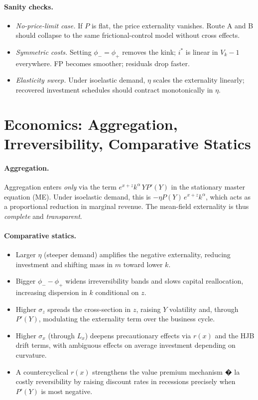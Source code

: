 ﻿\documentclass[11pt,letterpaper,oneside]{article}
\numberwithin{equation}{section}
\newcommand{\1}{\mathbf{1}}
\newcommand{\Lx}{L_x}
\begin{document}
\paragraph{Sanity checks.}
\begin{itemize}[leftmargin=1.25em]
\item \emph{No-price-limit case.} If $P$ is flat, the price externality vanishes. Route A and B should collapse to the same frictional-control model without cross effects.
\item \emph{Symmetric costs.} Setting $\phi_-=\phi_+$ removes the kink; $i^*$ is linear in $V_k-1$ everywhere. FP becomes smoother; residuals drop faster.
\item \emph{Elasticity sweep.} Under isoelastic demand, $\eta$ scales the externality linearly; recovered investment schedules should contract monotonically in $\eta$.
\end{itemize}

\section{Economics: Aggregation, Irreversibility, Comparative Statics}

\paragraph{Aggregation.}
Aggregation enters \emph{only} via the term $e^{x+z}k^\alpha\,Y P'(Y)$ in the stationary master equation (ME). Under isoelastic demand, this is $-\eta P(Y)\,e^{x+z}k^\alpha$, which acts as a proportional reduction in marginal revenue. The mean-field externality is thus \emph{complete} and \emph{transparent}.
 

\paragraph{Comparative statics.}
\begin{itemize}[leftmargin=1.25em]
\item Larger $\eta$ (steeper demand) amplifies the negative externality, reducing investment and shifting mass in $m$ toward lower $k$.
\item Bigger $\phi_- - \phi_+$ widens irreversibility bands and slows capital reallocation, increasing dispersion in $k$ conditional on $z$.
\item Higher $\sigma_z$ spreads the cross-section in $z$, raising $Y$ volatility and, through $P'(Y)$, modulating the externality term over the business cycle.
\item Higher $\sigma_x$ (through $\Lx$) deepens precautionary effects via $r(x)$ and the HJB drift terms, with ambiguous effects on average investment depending on curvature.
\item A countercyclical $r(x)$ strengthens the value premium mechanism � la costly reversibility by raising discount rates in recessions precisely when $P'(Y)$ is most negative.
\end{itemize}
\end{document}
